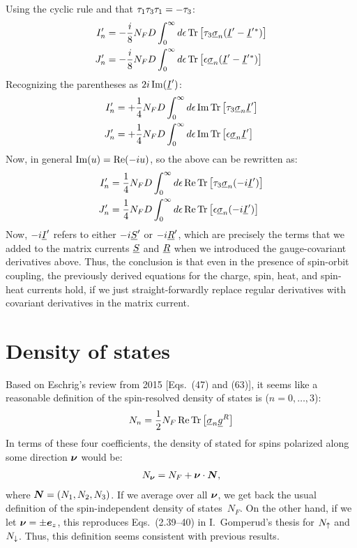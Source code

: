 Using the cyclic rule and that $\tau_{1}\tau_{3}\tau_{1} = -\tau_{3}$:
\begin{align}
  I_n' &= -\frac{i}{8}N_F D \int_{0}^{\infty} d\epsilon \operatorname{Tr}\big[ \tau_{3} \underline{\sigma}_{n} (\underline{I}' - \underline{I}'{}^*) \big]\\
  J_n' &= -\frac{i}{8}N_F D \int_{0}^{\infty} d\epsilon \operatorname{Tr}\big[ \epsilon \underline{\sigma}_{n} (\underline{I}' - \underline{I}'{}^*) \big]
\end{align}
Recognizing the parentheses as $2i\operatorname{Im}(\underline{I}')$:
\begin{align}
  I_n' &= +\frac{1}{4}N_F D \int_{0}^{\infty} d\epsilon \operatorname{Im}\operatorname{Tr}\big[ \tau_{3} \underline{\sigma}_{n} \underline{I}' \big]\\
  J_n' &= +\frac{1}{4}N_F D \int_{0}^{\infty} d\epsilon \operatorname{Im}\operatorname{Tr}\big[ \epsilon \underline{\sigma}_{n} \underline{I}' \big]
\end{align}
Now, in general $\operatorname{Im}(u) = \operatorname{Re}(-iu)$, so the above can be rewritten as:
\begin{align}
  I_n' &= \frac{1}{4}N_F D \int_{0}^{\infty} d\epsilon \operatorname{Re}\operatorname{Tr}\big[ \tau_{3} \underline{\sigma}_{n} (-i\underline{I}') \big]\\
  J_n' &= \frac{1}{4}N_F D \int_{0}^{\infty} d\epsilon \operatorname{Re}\operatorname{Tr}\big[ \epsilon \underline{\sigma}_{n} (-i\underline{I}') \big]
\end{align}
Now, $-i\underline{I}'$ refers to either $-i\underline{S}'$ or $-i\underline{R}'$, which are precisely the terms that we added to the matrix currents $\underline{S}$ and $\underline{R}$ when we introduced the gauge-covariant derivatives above.
Thus, the conclusion is that even in the presence of spin-orbit coupling, the previously derived equations for the charge, spin, heat, and spin-heat currents hold, if we just straight-forwardly replace regular derivatives with covariant derivatives in the matrix current.





\clearpage
\section{Density of states}
Based on Eschrig's review from 2015 [Eqs.~(47) and (63)], it seems like a reasonable definition of the spin-resolved density of states is ($n=0,\ldots,3$):
\begin{align}
  N_n = \frac{1}{2}N_F \operatorname{Re}\operatorname{Tr}\big[\underline{\sigma}_{n} \underline{g}^R\big]
\end{align}
In terms of these four coefficients, the density of stated for spins polarized along some direction $\bm{\nu}$ would be:
\begin{align}
  N_{\bm{\nu}}  = N_F + \bm{\nu} \cdot \bm{N},
\end{align}
where $\bm{N} = (N_1, N_2, N_3)$.
If we average over all $\bm{\nu}$, we get back the usual definition of the spin-independent density of states~$N_F$.
On the other hand, if we let $\bm{\nu} = \pm\bm{e}_z$, this reproduces Eqs.~(2.39--40) in I.~Gomperud's thesis for $N_\uparrow$ and $N_\downarrow$.
Thus, this definition seems consistent with previous results.

